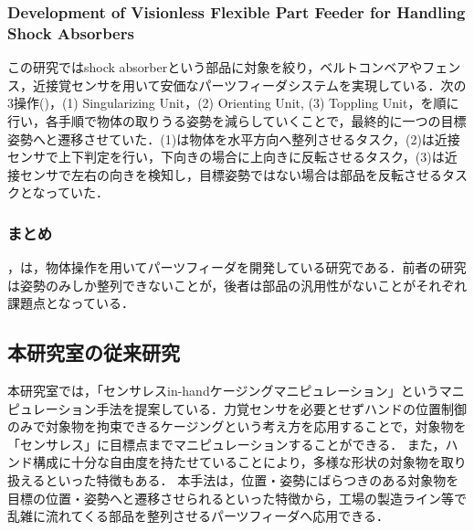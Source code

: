 \documentclass[a4paper,twoside,12pt,papersize, dvipdfmx]{iirthesis}
\begin{document}
\subsubsection{Development of Visionless Flexible Part Feeder for Handling Shock Absorbers \cite{udhayakumar2021}}
この研究ではshock absorberという部品に対象を絞り，ベルトコンベアやフェンス，近接覚センサを用いて安価なパーツフィーダシステムを実現している．次の3操作()，(1) Singularizing Unit，(2) Orienting Unit, (3) Toppling Unit，を順に行い，各手順で物体の取りうる姿勢を減らしていくことで，最終的に一つの目標姿勢へと遷移させていた．(1)は物体を水平方向へ整列させるタスク，(2)は近接センサで上下判定を行い，下向きの場合に上向きに反転させるタスク，(3)は近接センサで左右の向きを検知し，目標姿勢ではない場合は部品を反転させるタスクとなっていた．


\subsubsection{まとめ}
\cite{akella2000}，\cite{udhayakumar2021}は，物体操作を用いてパーツフィーダを開発している研究である．前者の研究は姿勢のみしか整列できないことが，後者は部品の汎用性がないことがそれぞれ課題点となっている．

\subsection{本研究室の従来研究}
本研究室では，「センサレスin-handケージングマニピュレーション」というマニピュレーション手法を提案している．力覚センサを必要とせずハンドの位置制御のみで対象物を拘束できるケージングという考え方を応用することで，対象物を「センサレス」に目標点までマニピュレーションすることができる．
また，ハンド構成に十分な自由度を持たせていることにより，多様な形状の対象物を取り扱えるといった特徴もある．
本手法は，位置・姿勢にばらつきのある対象物を目標の位置・姿勢へと遷移させられるといった特徴から，工場の製造ライン等で乱雑に流れてくる部品を整列させるパーツフィーダへ応用できる．
\end{document}
